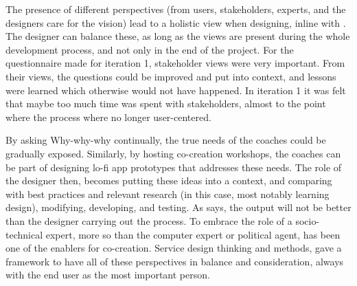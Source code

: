   The presence of different perspectives (from users, stakeholders, experts, and the designers care for the vision) lead to a holistic view when designing, inline with \cite{stickdorn}. The designer can balance these, as long as the views are present during the whole development process, and not only in the end of the project. For the questionnaire made for iteration 1, stakeholder views were very important. From their views, the questions could be improved and put into context, and lessons were learned which otherwise would not have happened. In iteration 1 it was felt that maybe too much time was spent with stakeholders, almost to the point where the process where no longer user-centered.

  By asking Why-why-why continually, the true needs of the coaches could be gradually exposed. Similarly, by hosting co-creation workshops, the coaches can be part of designing lo-fi app prototypes that addresses these needs. The role of the designer then, becomes putting these ideas into a context, and comparing with best practices and relevant research (in this case, most notably learning design), modifying, developing, and testing. As \cite{lowgren} says, the output will not be better than the designer carrying out the process. To embrace the role of a socio-technical expert, more so than the computer expert or political agent, has been one of the enablers for co-creation. Service design thinking and methods, gave a framework to have all of these perspectives in balance and consideration, always with the end user as the most important person.












